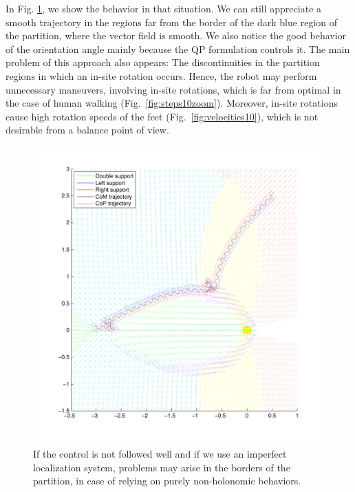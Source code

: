 In Fig. \ref{fig:steps10}, we show the behavior in that situation. We can still appreciate a smooth trajectory in the regions far from the border of the dark blue region of the partition, where the vector field is smooth. We also notice the good behavior of the orientation angle mainly because the QP formulation controls it. The main problem of this approach also appears: The discontinuities in the partition regions in which an in-site rotation occurs. Hence, the robot may perform unnecessary maneuvers, involving in-site rotations, which is far from optimal in the case of human walking (Fig.~\ref{fig:steps10zoom}). Moreover, in-site rotations cause high rotation speeds of the feet (Fig.~\ref{fig:velocities10}), which is not desirable from a balance point of view.

\begin{figure}[ht]
\centering
\includegraphics[scale=0.425]{figures/steps10.pdf}
\caption{If the control is not followed well and if we use an imperfect localization system, problems may arise in the borders of the partition, in case of relying on purely non-holonomic behaviors.}
\label{fig:steps10}
\end{figure}

